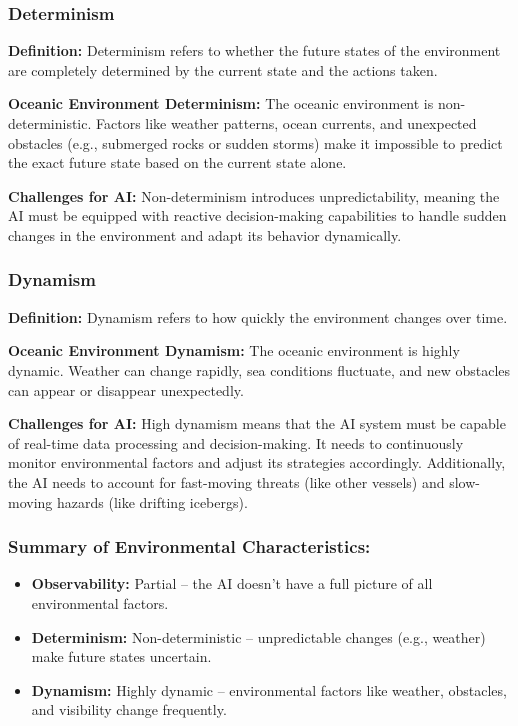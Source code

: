 \documentclass{article}
\begin{document}
\subsubsection{Determinism}
\textbf{Definition:} Determinism refers to whether the future states of the environment are completely determined by the current state and the actions taken.

\textbf{Oceanic Environment Determinism:} The oceanic environment is non-deterministic. Factors like weather patterns, ocean currents, and unexpected obstacles (e.g., submerged rocks or sudden storms) make it impossible to predict the exact future state based on the current state alone.

\textbf{Challenges for AI:} Non-determinism introduces unpredictability, meaning the AI must be equipped with reactive decision-making capabilities to handle sudden changes in the environment and adapt its behavior dynamically.

\subsubsection{Dynamism}
\textbf{Definition:} Dynamism refers to how quickly the environment changes over time.

\textbf{Oceanic Environment Dynamism:} The oceanic environment is highly dynamic. Weather can change rapidly, sea conditions fluctuate, and new obstacles can appear or disappear unexpectedly.

\textbf{Challenges for AI:} High dynamism means that the AI system must be capable of real-time data processing and decision-making. It needs to continuously monitor environmental factors and adjust its strategies accordingly. Additionally, the AI needs to account for fast-moving threats (like other vessels) and slow-moving hazards (like drifting icebergs).

\subsubsection{Summary of Environmental Characteristics:}
\begin{itemize}
    \item \textbf{Observability:} Partial – the AI doesn't have a full picture of all environmental factors.
    \item \textbf{Determinism:} Non-deterministic – unpredictable changes (e.g., weather) make future states uncertain.
    \item \textbf{Dynamism:} Highly dynamic – environmental factors like weather, obstacles, and visibility change frequently.
\end{itemize}
\end{document}
